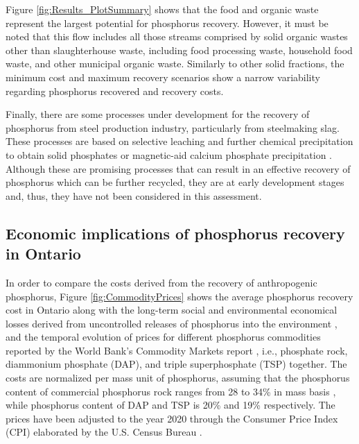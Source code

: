 \documentclass[]{elsarticle}
\begin{document}
Figure \ref{fig:Results_PlotSummary} shows that the food and organic waste represent the largest potential for phosphorus recovery. However, it must be noted that this flow includes all those streams comprised by solid organic wastes other than slaughterhouse waste, including food processing waste, household food waste, and other municipal organic waste. Similarly to other solid fractions, the minimum cost and maximum recovery scenarios show a narrow variability regarding phosphorus recovered and recovery costs.

Finally, there are some processes under development for the recovery of phosphorus from steel production industry, particularly from steelmaking slag. These processes are based on selective leaching and further chemical precipitation to obtain solid phosphates \citep{du2022recovery, du2019separation} or magnetic-aid calcium phosphate precipitation \citep{yokoyama2007separation}. Although these are promising processes that can result in an effective recovery of phosphorus which can be further recycled, they are at early development stages and, thus, they have not been considered in this assessment.

\subsection{Economic implications of phosphorus recovery in Ontario}
In order to compare the costs derived from the recovery of anthropogenic phosphorus, Figure \ref{fig:CommodityPrices} shows the average phosphorus recovery cost in Ontario
along with the long-term social and environmental economical losses derived from uncontrolled releases of phosphorus into the environment \citep{sampat2021valuing},
and
the temporal evolution of prices for different phosphorus commodities reported by the World Bank's Commodity Markets report \citep{CommoditiesPrices}, i.e., phosphate rock, diammonium phosphate (DAP), and triple superphosphate (TSP) together. The costs are normalized per mass unit of phosphorus, assuming that the phosphorus content of commercial phosphorus rock ranges from 28 to 34\% in mass basis \citep{FAO_PUses, UMin_P}, while phosphorus content of DAP and TSP is 20\% and 19\% respectively. The prices have been adjusted to the year 2020 through the Consumer Price Index (CPI) elaborated by the U.S. Census Bureau \citep{CPIIndex}.
\end{document}
